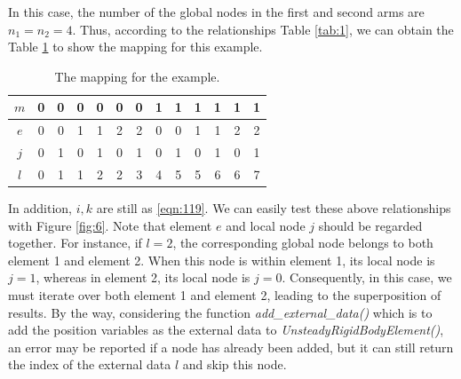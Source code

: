 \documentclass[a4paper,12pt]{article}
\begin{document}
In this case, the number of the global nodes in the first and second arms are $n_1=n_2=4$. Thus, according to the relationships Table \ref{tab:1}, we can obtain the Table \ref{tab:2} to show the mapping for this example.
\begin{table}[h]
	\centering
	\caption{The mapping for the example.}  
	\label{tab:2}
	\begin{tabular}{ |c|c|c|c|c|c|c|c|c|c|c|c|c| } 
		\hline
		$m$ & 0 & 0 &0 &0 &0 &0 & 1 & 1 &1 &1 &1 &1 \\ 
		\hline
		$e$ & 0 & 0 &1 &1 &2 &2 & 0 & 0 &1 &1 &2 &2 \\ 
		\hline
		$j$ & 0 & 1 &0 &1 &0 &1 & 0 & 1 &0 &1 &0 &1 \\ 
		\hline
		$l$ & 0 & 1 &1 &2 &2 &3 & 4 & 5 &5 &6 &6 &7 \\ 
		\hline
	\end{tabular}
\end{table}
In addition, $i,k$ are still as \eqref{eqn:119}. We can easily test these above relationships with Figure \ref{fig:6}. Note that element $e$ and local node $j$ should be regarded together. For instance, if $l=2$, the corresponding global node belongs to both element 1 and element 2. When this node is within element 1, its local node is $j=1$, whereas in element 2, its local node is $j=0$. Consequently, in this case, we must iterate over both element 1 and element 2, leading to the superposition of results. By the way, considering the function \textit{add\_external\_data()} which is to add the position variables as the external data to \textit{UnsteadyRigidBodyElement()}, an error may be reported if a node has already been added, but it can still return the index of the external data $l$ and skip this node.
\end{document}
